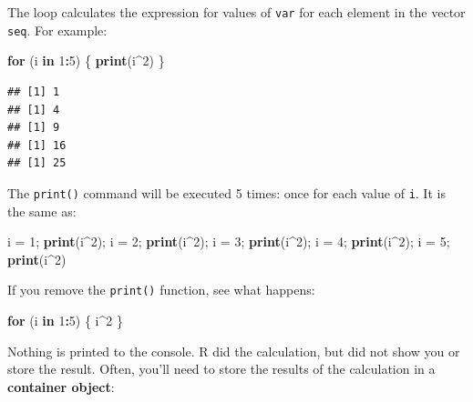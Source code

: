 \documentclass[]{book}
\newenvironment{Shaded}{\begin{snugshade}}{\end{snugshade}}
\newcommand{\KeywordTok}[1]{\textcolor[rgb]{0.13,0.29,0.53}{\textbf{#1}}}
\newcommand{\DecValTok}[1]{\textcolor[rgb]{0.00,0.00,0.81}{#1}}
\newcommand{\StringTok}[1]{\textcolor[rgb]{0.31,0.60,0.02}{#1}}
\newcommand{\ControlFlowTok}[1]{\textcolor[rgb]{0.13,0.29,0.53}{\textbf{#1}}}
\newcommand{\OperatorTok}[1]{\textcolor[rgb]{0.81,0.36,0.00}{\textbf{#1}}}
\newcommand{\NormalTok}[1]{#1}
\theoremstyle{definition}
\theoremstyle{definition}
\theoremstyle{definition}
\theoremstyle{remark}
\begin{document}
The loop calculates the expression for values of \texttt{var} for each
element in the vector \texttt{seq}. For example:

\begin{Shaded}
\begin{Highlighting}[]
\ControlFlowTok{for}\NormalTok{ (i }\ControlFlowTok{in} \DecValTok{1}\OperatorTok{:}\DecValTok{5}\NormalTok{) \{}
  \KeywordTok{print}\NormalTok{(i}\OperatorTok{^}\DecValTok{2}\NormalTok{)}
\NormalTok{\}}
\end{Highlighting}
\end{Shaded}

\begin{verbatim}
## [1] 1
## [1] 4
## [1] 9
## [1] 16
## [1] 25
\end{verbatim}

The \texttt{print()} command will be executed 5 times: once for each
value of \texttt{i}. It is the same as:

\begin{Shaded}
\begin{Highlighting}[]
\NormalTok{i =}\StringTok{ }\DecValTok{1}\NormalTok{; }\KeywordTok{print}\NormalTok{(i}\OperatorTok{^}\DecValTok{2}\NormalTok{); i =}\StringTok{ }\DecValTok{2}\NormalTok{; }\KeywordTok{print}\NormalTok{(i}\OperatorTok{^}\DecValTok{2}\NormalTok{); i =}\StringTok{ }\DecValTok{3}\NormalTok{; }\KeywordTok{print}\NormalTok{(i}\OperatorTok{^}\DecValTok{2}\NormalTok{); i =}\StringTok{ }\DecValTok{4}\NormalTok{; }\KeywordTok{print}\NormalTok{(i}\OperatorTok{^}\DecValTok{2}\NormalTok{); i =}\StringTok{ }\DecValTok{5}\NormalTok{; }\KeywordTok{print}\NormalTok{(i}\OperatorTok{^}\DecValTok{2}\NormalTok{)}
\end{Highlighting}
\end{Shaded}

If you remove the \texttt{print()} function, see what happens:

\begin{Shaded}
\begin{Highlighting}[]
\ControlFlowTok{for}\NormalTok{ (i }\ControlFlowTok{in} \DecValTok{1}\OperatorTok{:}\DecValTok{5}\NormalTok{) \{}
\NormalTok{  i}\OperatorTok{^}\DecValTok{2}
\NormalTok{\}}
\end{Highlighting}
\end{Shaded}

Nothing is printed to the console. R did the calculation, but did not
show you or store the result. Often, you'll need to store the results of
the calculation in a \textbf{container object}:
\end{document}

